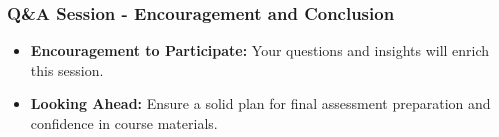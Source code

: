 \documentclass[aspectratio=169]{beamer}
\begin{document}
\begin{frame}[fragile]
    \frametitle{Q\&A Session - Encouragement and Conclusion}
    \begin{itemize}
        \item \textbf{Encouragement to Participate:} 
            Your questions and insights will enrich this session. 
        \item \textbf{Looking Ahead:} 
            Ensure a solid plan for final assessment preparation and confidence in course materials.
    \end{itemize}
\end{frame}
\end{document}
